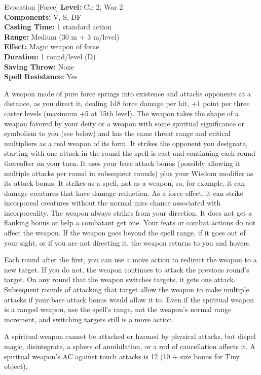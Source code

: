 {Evocation [Force]}
{
	\textbf{Level:}
	Clr 2, War 2\\
	\textbf{Components:}
	V, S, DF\\
	\textbf{Casting Time:}
	1 standard action\\
	\textbf{Range:}
	Medium (30 m + 3 m/level)\\
	\textbf{Effect:}
	Magic weapon of force\\
	\textbf{Duration:}
	1 round/level (D)\\
	\textbf{Saving Throw:}
	None\\
	\textbf{Spell Resistance:}
	Yes\\
}
{
	A weapon made of pure force springs into existence and attacks opponents at a distance, as you direct it, dealing 1d8 force damage per hit, +1 point per three caster levels (maximum +5 at 15th level). The weapon takes the shape of a weapon favored by your deity or a weapon with some spiritual significance or symbolism to you (see below) and has the same threat range and critical multipliers as a real weapon of its form. It strikes the opponent you designate, starting with one attack in the round the spell is cast and continuing each round thereafter on your turn. It uses your base attack bonus (possibly allowing it multiple attacks per round in subsequent rounds) plus your Wisdom modifier as its attack bonus. It strikes as a spell, not as a weapon, so, for example, it can damage creatures that have damage reduction. As a force effect, it can strike incorporeal creatures without the normal miss chance associated with incorporeality. The weapon always strikes from your direction. It does not get a flanking bonus or help a combatant get one. Your feats or combat actions do not affect the weapon. If the weapon goes beyond the spell range, if it goes out of your sight, or if you are not directing it, the weapon returns to you and hovers.

	Each round after the first, you can use a move action to redirect the weapon to a new target. If you do not, the weapon continues to attack the previous round's target. On any round that the weapon switches targets, it gets one attack. Subsequent rounds of attacking that target allow the weapon to make multiple attacks if your base attack bonus would allow it to. Even if the spiritual weapon is a ranged weapon, use the spell's range, not the weapon's normal range increment, and switching targets still is a move action.

	A spiritual weapon cannot be attacked or harmed by physical attacks, but dispel magic, disintegrate, a sphere of annihilation, or a rod of cancellation affects it. A spiritual weapon's AC against touch attacks is 12 (10 + size bonus for Tiny object).

}
